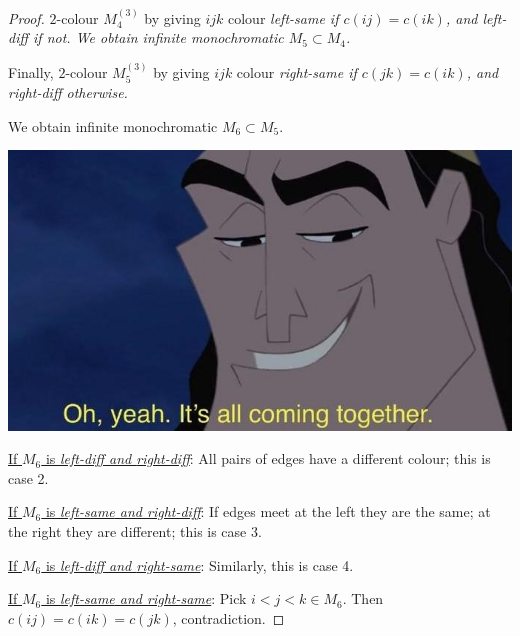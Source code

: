 \documentclass[10pt]{article}
\begin{document}
\begin{proof}
    $2$-colour $M_4^{(3)}$ by giving $ijk$ colour \it{left-same} if $c(ij) = c(ik)$, and \it{left-diff} if not. We obtain infinite monochromatic $M_5\subset M_4$.

    Finally, $2$-colour $M_5^{(3)}$ by giving $ijk$ colour \it{right-same} if $c(jk) = c(ik)$, and \it{right-diff} otherwise.

    We obtain infinite monochromatic $M_6\subset M_5$.
\begin{center}
    \includegraphics[scale=0.8]{together.jpg}
\end{center}

    \underline{If $M_6$ is \it{left-diff} and \it{right-diff}}: All pairs of edges have a different colour; this is case 2.

    \underline{If $M_6$ is \it{left-same} and \it{right-diff}}: If edges meet at the left they are the same; at the right they are different; this is case 3.

    \underline{If $M_6$ is \it{left-diff} and \it{right-same}}: Similarly, this is case 4.

    \underline{If $M_6$ is \it{left-same} and \it{right-same}}: Pick $i < j < k \in M_6$. Then $c(ij) = c(ik) = c(jk)$, contradiction.
\end{proof}
\end{document}
